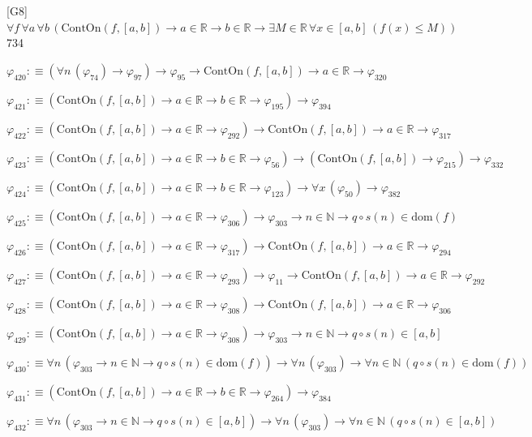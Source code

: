 \begin{fullproof}{[G8]}{$\forall f\,\forall a\,\forall b\,(\mathrm{ContOn}(f,[a,b]) \to a \in \mathbb{R} \to b \in \mathbb{R} \to \exists M \in \mathbb{R}\,\forall x \in [a,b]\,(f(x) \leq M))$}{734}
\begin{abbrevlist}
\item $\varphi_{420} :\equiv (\forall n\,(\varphi_{74}) \to \varphi_{97}) \to \varphi_{95} \to \mathrm{ContOn}(f,[a,b]) \to a \in \mathbb{R} \to \varphi_{320}$
\item $\varphi_{421} :\equiv (\mathrm{ContOn}(f,[a,b]) \to a \in \mathbb{R} \to b \in \mathbb{R} \to \varphi_{195}) \to \varphi_{394}$
\item $\varphi_{422} :\equiv (\mathrm{ContOn}(f,[a,b]) \to a \in \mathbb{R} \to \varphi_{292}) \to \mathrm{ContOn}(f,[a,b]) \to a \in \mathbb{R} \to \varphi_{317}$
\item $\varphi_{423} :\equiv (\mathrm{ContOn}(f,[a,b]) \to a \in \mathbb{R} \to b \in \mathbb{R} \to \varphi_{56}) \to (\mathrm{ContOn}(f,[a,b]) \to \varphi_{215}) \to \varphi_{332}$
\item $\varphi_{424} :\equiv (\mathrm{ContOn}(f,[a,b]) \to a \in \mathbb{R} \to b \in \mathbb{R} \to \varphi_{123}) \to \forall x\,(\varphi_{50}) \to \varphi_{382}$
\item $\varphi_{425} :\equiv (\mathrm{ContOn}(f,[a,b]) \to a \in \mathbb{R} \to \varphi_{306}) \to \varphi_{303} \to n \in \mathbb{N} \to q \circ s(n) \in \mathrm{dom}(f)$
\item $\varphi_{426} :\equiv (\mathrm{ContOn}(f,[a,b]) \to a \in \mathbb{R} \to \varphi_{317}) \to \mathrm{ContOn}(f,[a,b]) \to a \in \mathbb{R} \to \varphi_{294}$
\item $\varphi_{427} :\equiv (\mathrm{ContOn}(f,[a,b]) \to a \in \mathbb{R} \to \varphi_{293}) \to \varphi_{11} \to \mathrm{ContOn}(f,[a,b]) \to a \in \mathbb{R} \to \varphi_{292}$
\item $\varphi_{428} :\equiv (\mathrm{ContOn}(f,[a,b]) \to a \in \mathbb{R} \to \varphi_{308}) \to \mathrm{ContOn}(f,[a,b]) \to a \in \mathbb{R} \to \varphi_{306}$
\item $\varphi_{429} :\equiv (\mathrm{ContOn}(f,[a,b]) \to a \in \mathbb{R} \to \varphi_{308}) \to \varphi_{303} \to n \in \mathbb{N} \to q \circ s(n) \in [a,b]$
\item $\varphi_{430} :\equiv \forall n\,(\varphi_{303} \to n \in \mathbb{N} \to q \circ s(n) \in \mathrm{dom}(f)) \to \forall n\,(\varphi_{303}) \to \forall n \in \mathbb{N}\,(q \circ s(n) \in \mathrm{dom}(f))$
\item $\varphi_{431} :\equiv (\mathrm{ContOn}(f,[a,b]) \to a \in \mathbb{R} \to b \in \mathbb{R} \to \varphi_{264}) \to \varphi_{384}$
\item $\varphi_{432} :\equiv \forall n\,(\varphi_{303} \to n \in \mathbb{N} \to q \circ s(n) \in [a,b]) \to \forall n\,(\varphi_{303}) \to \forall n \in \mathbb{N}\,(q \circ s(n) \in [a,b])$

\end{abbrevlist}
\end{fullproof}

